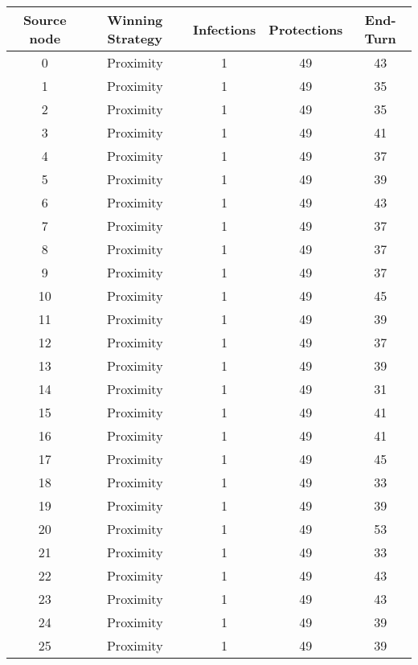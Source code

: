 \documentclass[results.tex]{subfiles}
\begin{document}
\begin{center}
  \begin{tabular}{| c || c | c | c | c |}
    \hline
    {\bfseries Source node} & {\bfseries Winning Strategy} & {\bfseries Infections} & {\bfseries Protections} & {\bfseries End-Turn} \\  %
    \hline\hline
    0 & Proximity & 1 & 49 & 43 \\ 
    \hline
    1 & Proximity & 1 & 49 & 35 \\ 
    \hline
    2 & Proximity & 1 & 49 & 35 \\ 
    \hline
    3 & Proximity & 1 & 49 & 41 \\ 
    \hline
    4 & Proximity & 1 & 49 & 37 \\ 
    \hline
    5 & Proximity & 1 & 49 & 39 \\ 
    \hline
    6 & Proximity & 1 & 49 & 43 \\ 
    \hline
    7 & Proximity & 1 & 49 & 37 \\ 
    \hline
    8 & Proximity & 1 & 49 & 37 \\ 
    \hline
    9 & Proximity & 1 & 49 & 37 \\ 
    \hline
    10 & Proximity & 1 & 49 & 45 \\ 
    \hline
    11 & Proximity & 1 & 49 & 39 \\ 
    \hline
    12 & Proximity & 1 & 49 & 37 \\ 
    \hline
    13 & Proximity & 1 & 49 & 39 \\ 
    \hline
    14 & Proximity & 1 & 49 & 31 \\ 
    \hline
    15 & Proximity & 1 & 49 & 41 \\ 
    \hline
    16 & Proximity & 1 & 49 & 41 \\ 
    \hline
    17 & Proximity & 1 & 49 & 45 \\ 
    \hline
    18 & Proximity & 1 & 49 & 33 \\ 
    \hline
    19 & Proximity & 1 & 49 & 39 \\ 
    \hline
    20 & Proximity & 1 & 49 & 53 \\ 
    \hline
    21 & Proximity & 1 & 49 & 33 \\ 
    \hline
    22 & Proximity & 1 & 49 & 43 \\ 
    \hline
    23 & Proximity & 1 & 49 & 43 \\ 
    \hline
    24 & Proximity & 1 & 49 & 39 \\ 
    \hline
    25 & Proximity & 1 & 49 & 39 \\ 

\end{tabular}
\end{center}
\end{document}
